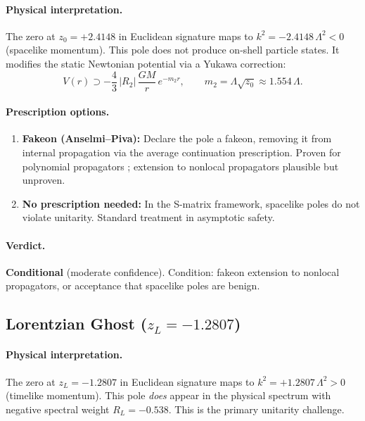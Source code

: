 \documentclass[11pt,a4paper]{article}
\begin{document}
\paragraph{Physical interpretation.}
The zero at $z_0 = +2.4148$ in Euclidean signature maps to
$k^2 = -2.4148\,\Lambda^2 < 0$ (spacelike momentum).  This pole does
not produce on-shell particle states.  It modifies the static Newtonian
potential via a Yukawa correction:
\begin{equation}\label{eq:yukawa-z0}
  V(r) \supset -\frac{4}{3}\,|R_2|\,\frac{GM}{r}\,e^{-m_2 r},
  \qquad
  m_2 = \Lambda\sqrt{z_0} \approx 1.554\,\Lambda.
\end{equation}

\paragraph{Prescription options.}
\begin{enumerate}[nosep]
  \item \textbf{Fakeon (Anselmi--Piva):} Declare the pole a fakeon,
    removing it from internal propagation via the average continuation
    prescription.  Proven for polynomial propagators
    \cite{Anselmi2018}; extension to nonlocal propagators plausible
    but unproven.
  \item \textbf{No prescription needed:} In the S-matrix framework,
    spacelike poles do not violate unitarity.  Standard treatment in
    asymptotic safety.
\end{enumerate}

\paragraph{Verdict.} \textbf{Conditional} (moderate confidence).
Condition: fakeon extension to nonlocal propagators, or acceptance that
spacelike poles are benign.

\subsection{Lorentzian Ghost ($z_L = -1.2807$)}
\label{sec:lorentzian-ghost}

\paragraph{Physical interpretation.}
The zero at $z_L = -1.2807$ in Euclidean signature maps to
$k^2 = +1.2807\,\Lambda^2 > 0$ (timelike momentum).  This pole
\emph{does} appear in the physical spectrum with negative spectral
weight $R_L = -0.538$.  This is the primary unitarity challenge.
\end{document}
